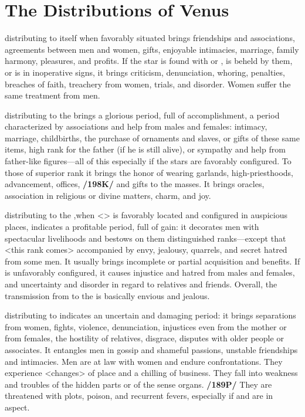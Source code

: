 \section{The Distributions of Venus}

\Venus\xspace distributing to itself when favorably situated brings friendships and associations, agreements between men and women, gifts, enjoyable intimacies, marriage, family harmony, pleasures, and profits. If the star is found with \Saturn\xspace or \Mars, is beheld by them, or is in inoperative signs, it brings criticism, denunciation, whoring, penalties, breaches of faith, treachery from women, trials, and disorder. Women suffer the same treatment from men.

\Venus\xspace distributing to the \Sun\xspace brings a glorious period, full of accomplishment, a period characterized by associations and help from males and females: intimacy, marriage, childbirths, the purchase of ornaments and slaves, or gifts of these same items, high rank for the father (if he is still alive), or sympathy and help from father-like figures—all of this especially if the stars are favorably configured. To those of superior rank it brings the honor of wearing garlands, high-priesthoods, advancement, offices, \textbf{/198K/} and
gifts to the masses. It brings oracles, association in religious or divine matters, charm, and joy.

\Venus\xspace distributing to the \Moon,when <\Venus> is favorably located and configured in auspicious places, indicates a profitable period, full of gain: it decorates men with spectacular livelihoods and bestows on them distinguished ranks—except that <this rank comes> accompanied by envy, jealousy, quarrels, and secret hatred from some men. It usually brings incomplete or partial acquisition and benefits. If \Venus\xspace is unfavorably configured, it causes injustice and hatred from males and females, and uncertainty and disorder
in regard to relatives and friends. Overall, the transmission from \Venus\xspace to the \Moon\xspace is basically envious and jealous.

\Venus\xspace distributing to \Saturn\xspace indicates an uncertain and damaging period: it brings separations from
women, fights, violence, denunciation, injustices even from the mother or from females, the hostility of relatives, disgrace, disputes with older people or associates. It entangles men in gossip and shameful passions, unstable friendships and intimacies. Men are at law with women and endure confrontations. They experience <changes> of place and a chilling of business. They fall into weakness and troubles of the hidden parts or of the sense organs. \textbf{/189P/} They are threatened with plots, poison, and recurrent fevers,
especially if \Mars\xspace and \Mercury\xspace are in aspect.

